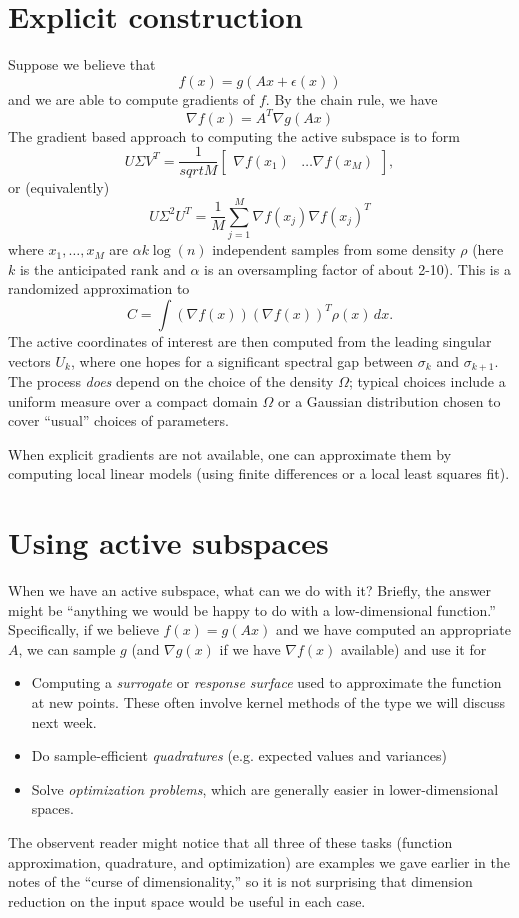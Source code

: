 \documentclass[12pt, leqno]{article} %
\begin{document}
\section{Explicit construction}

Suppose we believe that
\[
  f(x) = g(Ax + \epsilon(x))
\]
and we are able to compute gradients of $f$.  By the chain rule, we
have
\[
  \nabla f(x) = A^T \nabla g(Ax)
\]
The gradient based approach to computing the active subspace is to
form
\[
  U \Sigma V^T =
  \frac{1}{sqrt{M}}
  \begin{bmatrix} \nabla f(x_1) & \ldots \nabla f(x_M) \end{bmatrix},
\]
or (equivalently)
\[
  U \Sigma^2 U^T = \frac{1}{M}
    \sum_{j=1}^M \nabla f(x_j) \nabla f(x_j)^T
\]
where $x_1, \ldots, x_M$ are $\alpha k \log(n)$ independent samples
from some density $\rho$ (here $k$ is the anticipated rank and
$\alpha$ is an oversampling factor of about 2-10).  This is a
randomized approximation to
\[
  C = \int (\nabla f(x)) (\nabla f(x))^T \rho(x) \, dx.
\]
The active coordinates of interest are then computed from the leading
singular vectors $U_k$, where one hopes for a significant spectral gap
between $\sigma_k$ and $\sigma_{k+1}$.  The process {\em does} depend
on the choice of the density $\Omega$; typical choices include a
uniform measure over a compact domain $\Omega$ or a Gaussian
distribution chosen to cover ``usual'' choices of parameters.

When explicit gradients are not available, one can approximate them by
computing local linear models (using finite differences or a local
least squares fit).

\section{Using active subspaces}

When we have an active subspace, what can we do with it?  Briefly, the
answer might be ``anything we would be happy to do with a
low-dimensional function.''  Specifically, if we believe
$f(x) = g(Ax)$ and we have computed an appropriate $A$,
we can sample $g$ (and $\nabla g(x)$ if we have $\nabla f(x)$
available) and use it for
\begin{itemize}
\item Computing a {\em surrogate} or {\em response surface} used to
  approximate the function at new points.  These often involve kernel
  methods of the type we will discuss next week.
\item Do sample-efficient {\em quadratures} (e.g. expected values and variances)
\item Solve {\em optimization problems}, which are generally easier in
  lower-dimensional spaces.
\end{itemize}
The observent reader might notice that all three of these tasks
(function approximation, quadrature, and optimization) are examples we
gave earlier in the notes of the ``curse of dimensionality,''
so it is not surprising that dimension reduction on the input space
would be useful in each case.
\end{document}
